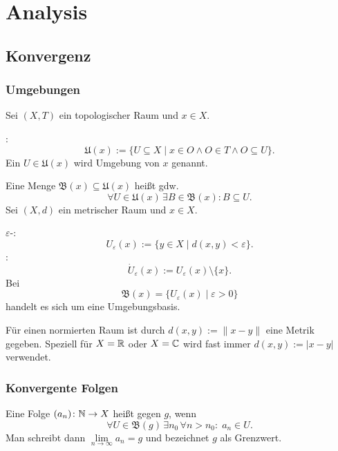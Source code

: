 
\chapter{Analysis}
\section{Konvergenz}
\subsection{Umgebungen}
Sei $(X,T)$ ein topologischer Raum und $x\in X$.

\noindent
{} :
\begin{equation}
\mathfrak U(x) := \{U\subseteq X\mid x\in O\land O\in T
\land O\subseteq U\}.
\end{equation}
Ein $U\in\mathfrak U(x)$ wird Umgebung von $x$ genannt.

\noindent
{} Eine Menge $\mathfrak B(x)\subseteq \mathfrak U(x)$
heißt  gdw.
\begin{equation}
\forall U{\in}\mathfrak U(x)\,\exists B{\in}\mathfrak B(x)\colon
B\subseteq U.
\end{equation}
Sei $(X,d)$ ein metrischer Raum und $x\in X$.

\noindent
{} $\varepsilon$-:
\begin{equation}\label{eq:epsilon-Umgebung}
U_\varepsilon(x) := \{y\in X\mid d(x,y)<\varepsilon\}.
\end{equation}
:
\begin{equation}
\dot U_\varepsilon(x) := U_\varepsilon(x)\setminus\{x\}.
\end{equation}
Bei
\begin{equation}
\mathfrak B(x) = \{U_\varepsilon(x)\mid\varepsilon>0\}
\end{equation}
handelt es sich um eine Umgebungsbasis.

Für einen normierten Raum ist durch $d(x,y):=\|x-y\|$ eine
Metrik gegeben. Speziell für $X=\mathbb R$ oder $X=\mathbb C$ wird fast immer
$d(x,y):=|x-y|$ verwendet.

\subsection{Konvergente Folgen}
Eine Folge $(a_n)\colon \mathbb N\to X$ heißt  gegen $g$, wenn%
\begin{equation}\label{eq:konvergent}
\forall U{\in}\mathfrak B(g)\,\exists n_0\,\forall n{>}n_0\colon\;
a_n\in U.
\end{equation}
Man schreibt dann $\lim\limits_{n\to\infty} a_n=g$ und bezeichnet
$g$ als Grenzwert.

